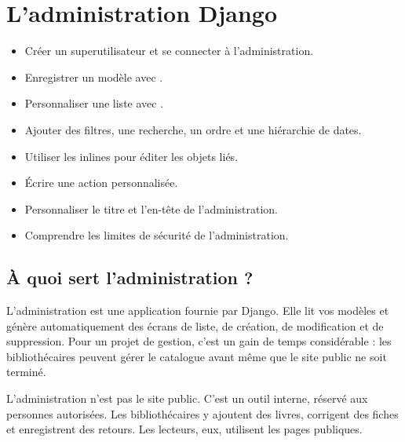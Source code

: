 \chapter{L'administration Django}
\label{ch:admin}


\begin{objectifs}
\begin{itemize}
  \item Créer un superutilisateur et se connecter à l'administration.
  \item Enregistrer un modèle avec .
  \item Personnaliser une liste avec .
  \item Ajouter des filtres, une recherche, un ordre et une hiérarchie de dates.
  \item Utiliser les inlines pour éditer les objets liés.
  \item Écrire une action personnalisée.
  \item Personnaliser le titre et l'en-tête de l'administration.
  \item Comprendre les limites de sécurité de l'administration.
\end{itemize}
\end{objectifs}

\section{À quoi sert l'administration ?}

L'administration est une application fournie par Django. Elle lit vos modèles et
génère automatiquement des écrans de liste, de création, de modification et de
suppression. Pour un projet de gestion, c'est un gain de temps considérable : les
bibliothécaires peuvent gérer le catalogue avant même que le site public ne soit
terminé.

\begin{retenir}
L'administration n'est pas le site public. C'est un outil interne, réservé aux
personnes autorisées. Les bibliothécaires y ajoutent des livres, corrigent des
fiches et enregistrent des retours. Les lecteurs, eux, utilisent les pages
publiques.
\end{retenir}


